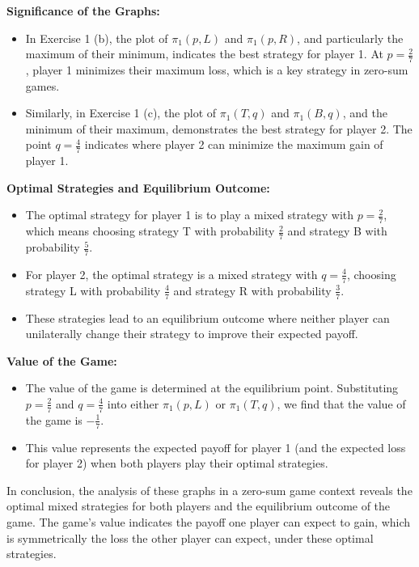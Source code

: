 \documentclass[a4paper]{article}
\begin{document}
\begin{enumerate}[label=(\alph*)]
    \textbf{Significance of the Graphs:}
    \begin{itemize}
      \item In Exercise 1 (b), the plot of $\pi_1(p, L)$ and $\pi_1(p, R)$, and particularly the maximum of their minimum, indicates the best strategy for player 1. At $p = \frac{2}{7}$, player 1 minimizes their maximum loss, which is a key strategy in zero-sum games.
      \item Similarly, in Exercise 1 (c), the plot of $\pi_1(T, q)$ and $\pi_1(B, q)$, and the minimum of their maximum, demonstrates the best strategy for player 2. The point $q = \frac{4}{7}$ indicates where player 2 can minimize the maximum gain of player 1.
    \end{itemize}

    \textbf{Optimal Strategies and Equilibrium Outcome:}
    \begin{itemize}
      \item The optimal strategy for player 1 is to play a mixed strategy with $p = \frac{2}{7}$, which means choosing strategy T with probability $\frac{2}{7}$ and strategy B with probability $\frac{5}{7}$.
      \item For player 2, the optimal strategy is a mixed strategy with $q = \frac{4}{7}$, choosing strategy L with probability $\frac{4}{7}$ and strategy R with probability $\frac{3}{7}$.
      \item These strategies lead to an equilibrium outcome where neither player can unilaterally change their strategy to improve their expected payoff.
    \end{itemize}

    \textbf{Value of the Game:}
    \begin{itemize}
      \item The value of the game is determined at the equilibrium point. Substituting $p = \frac{2}{7}$ and $q = \frac{4}{7}$ into either $\pi_1(p, L)$ or $\pi_1(T, q)$, we find that the value of the game is $-\frac{1}{7}$.
      \item This value represents the expected payoff for player 1 (and the expected loss for player 2) when both players play their optimal strategies.
    \end{itemize}

    In conclusion, the analysis of these graphs in a zero-sum game context reveals the optimal mixed strategies for both players and the equilibrium outcome of the game. The game's value indicates the payoff one player can expect to gain, which is symmetrically the loss the other player can expect, under these optimal strategies.
\end{enumerate}
\end{document}
